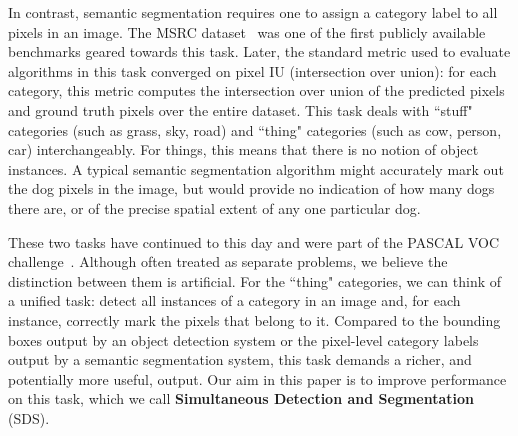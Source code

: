 \documentclass[runningheads]{llncs}
\begin{document}
In contrast, semantic segmentation requires one to assign a category label to all pixels in an image. The MSRC dataset~\cite{ShottonECCV06} was one of the first publicly available benchmarks geared towards this task. Later, the standard metric used to evaluate algorithms in this task converged on pixel IU (intersection over union): for each category, this metric computes the intersection over union of the predicted pixels and ground truth pixels over the entire dataset. This task deals with ``stuff" categories (such as grass, sky, road) and ``thing" categories (such as cow, person, car) interchangeably. For things, this means that there is no notion of object instances. A typical semantic segmentation algorithm might accurately mark out the  dog pixels in the image, but would provide no indication of how many dogs there are, or of the precise spatial extent of any one particular dog. 

These two tasks have continued to this day and were part of the PASCAL VOC challenge~\cite{EveringhamIJCV10}. Although often treated as separate problems, we believe the distinction between them is artificial. For the ``thing" categories, we can think of a unified task: detect all instances of a category in an image and, for each instance, correctly mark the pixels that belong to it. Compared to the bounding boxes output by an object detection system or the pixel-level category labels output by a semantic segmentation system, this task demands a richer, and potentially more useful, output. Our aim in this paper is to improve performance on this task, which we call \textbf{Simultaneous Detection and Segmentation} (SDS).
\end{document}
